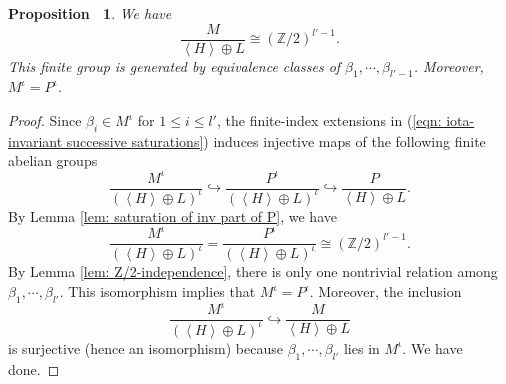 \documentclass[12pt,reqno,a4paper]{amsart}
\newtheorem{prop}[thm]{Proposition~}
\theoremstyle{remark}
\theoremstyle{definition}
\begin{document}
\begin{prop}
\label{prop: saturation of M_F}  
We have 
    \begin{equation*}
        \frac{M}{\left\langle H\right\rangle \oplus L}\cong (\mathbb{Z}/2)^{l'-1}.
    \end{equation*}
    This finite group is generated by equivalence classes of $\beta_1,\cdots, \beta_{l'-1}$.
    Moreover, $M^{\iota} = P^{\iota}$.
\end{prop}
\begin{proof}
Since $\beta_i \in M^{\iota}$ for $1\le i\le l'$, the finite-index extensions in (\ref{eqn: iota-invariant successive saturations}) induces injective maps of the following finite abelian groups
\begin{equation*}
    \frac{M^{\iota}}{(\left\langle H \right\rangle\oplus L)^{\iota}} \hookrightarrow \frac{P^{\iota}}{(\left\langle H \right\rangle\oplus L)^{\iota}} \hookrightarrow \frac{P}{\left\langle H \right\rangle\oplus L}.
\end{equation*}
By Lemma \ref{lem: saturation of inv part of P}, we have 
\begin{equation*}
    \frac{M^{\iota}}{(\left\langle H \right\rangle\oplus L)^{\iota}} = \frac{P^{\iota}}{(\left\langle H \right\rangle\oplus L)^{\iota}} \cong (\mathbb{Z}/2)^{l'-1}.
\end{equation*}
By Lemma \ref{lem: Z/2-independence}, there is only one nontrivial relation among $\beta_1, \cdots, \beta_{l'}$. 
This isomorphism implies that $M^{\iota} = P^{\iota}$.
Moreover, the inclusion 
\begin{equation*}
    \frac{M^{\iota}}{(\left\langle H \right\rangle\oplus L)^{\iota}} \hookrightarrow \frac{M}{\left\langle H \right\rangle\oplus L}
\end{equation*}
is surjective (hence an isomorphism) because $\beta_1, \cdots, \beta_{l'}$ lies in $M^\iota$. We have done.
\end{proof}
\end{document}

